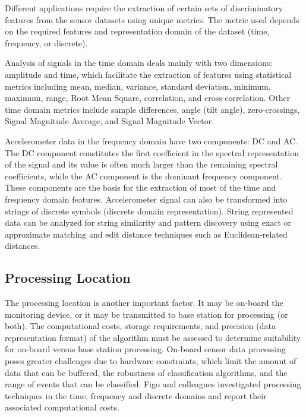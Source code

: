\documentclass[11pt, oneside]{report}
\begin{document}
Different applications require the extraction of certain sets of discriminatory features from the sensor datasets using unique metrics\cite{Khusainov2013}. The metric used depends on the required features and representation domain of the dataset (time, frequency, or discrete)\cite{Khusainov2013}. 

Analysis of signals in the time domain deals mainly with two dimensions: amplitude and time, which facilitate the extraction of features using statistical metrics including mean, median, variance, standard deviation, minimum, maximum, range, Root Mean Square, correlation, and cross-correlation\cite{Figo2010}. Other time domain metrics include sample differences, angle (tilt angle), zero-crossings, Signal Magnitude Average, and Signal Magnitude Vector\cite{Figo2010}.

Accelerometer data in the frequency domain have two components: DC and AC. The DC component constitutes the first coefficient in the spectral representation of the signal and its value is often much larger than the remaining spectral coefficients, while the AC component is the dominant frequency component\cite{Figo2010}. These components are the basis for the extraction of most of the time and frequency domain features. Accelerometer signal can also be transformed into strings of discrete symbols (discrete domain representation)\cite{Figo2010}. String represented data can be analyzed for string similarity and pattern discovery using exact or approximate matching and edit distance techniques such as Euclidean-related distances\cite{Figo2010}.

\subsection{Processing Location}

The processing location is another important factor. It may be on-board the monitoring device, or it may be transmitted to base station for processing (or both)\cite{Khusainov2013}. The computational costs, storage requirements, and precision (data representation format) of the algorithm must be assessed to determine suitability for on-board versus base station processing\cite{Khusainov2013}. On-board sensor data processing poses greater challenges due to hardware constraints, which limit the amount of data that can be buffered, the robustness of classification algorithms, and the range of events that can be classified\cite{Karantonis2006}. Figo and colleagues\cite{Figo2010} investigated processing techniques in the time, frequency and discrete domains and report their associated computational costs.
\end{document}

